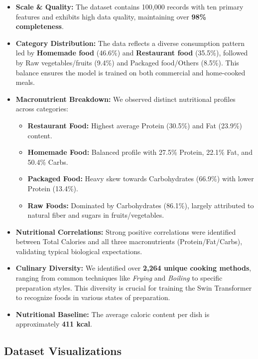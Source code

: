 \documentclass[fleqn,10pt]{SelfArx} %
\begin{document}
\begin{itemize}[noitemsep]
    \item \textbf{Scale \& Quality:} The dataset contains 100,000 records with ten primary features and exhibits high data quality, maintaining over \textbf{98\% completeness}.
    \item \textbf{Category Distribution:} The data reflects a diverse consumption pattern led by \textbf{Homemade food} (46.6\%) and \textbf{Restaurant food} (35.5\%), followed by Raw vegetables/fruits (9.4\%) and Packaged food/Others (8.5\%). This balance ensures the model is trained on both commercial and home-cooked meals.
    \item \textbf{Macronutrient Breakdown:} We observed distinct nutritional profiles across categories:
    \begin{itemize}
        \item \textbf{Restaurant Food:} Highest average Protein (30.5\%) and Fat (23.9\%) content.
        \item \textbf{Homemade Food:} Balanced profile with 27.5\% Protein, 22.1\% Fat, and 50.4\% Carbs.
        \item \textbf{Packaged Food:} Heavy skew towards Carbohydrates (66.9\%) with lower Protein (13.4\%).
        \item \textbf{Raw Foods:} Dominated by Carbohydrates (86.1\%), largely attributed to natural fiber and sugars in fruits/vegetables.
    \end{itemize}
    \item \textbf{Nutritional Correlations:} Strong positive correlations were identified between Total Calories and all three macronutrients (Protein/Fat/Carbs), validating typical biological expectations.
    \item \textbf{Culinary Diversity:} We identified over \textbf{2,264 unique cooking methods}, ranging from common techniques like \textit{Frying} and \textit{Boiling} to specific preparation styles. This diversity is crucial for training the Swin Transformer to recognize foods in various states of preparation.
    \item \textbf{Nutritional Baseline:} The average caloric content per dish is approximately \textbf{411 kcal}.
\end{itemize}

\subsection{Dataset Visualizations}
\end{document}
